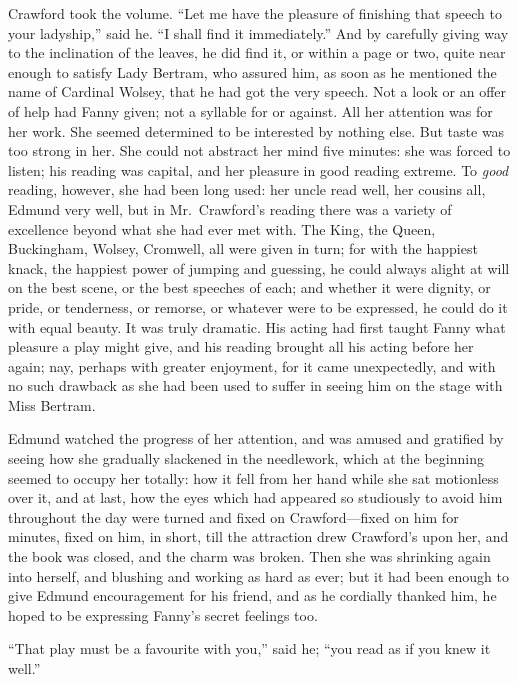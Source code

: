 Crawford took the volume.  ``Let me have the pleasure
of finishing that speech to your ladyship,'' said he.
``I shall find it immediately.''  And by carefully giving
way to the inclination of the leaves, he did find it,
or within a page or two, quite near enough to satisfy
Lady Bertram, who assured him, as soon as he mentioned the
name of Cardinal Wolsey, that he had got the very speech.
Not a look or an offer of help had Fanny given; not a syllable
for or against.  All her attention was for her work.
She seemed determined to be interested by nothing else.
But taste was too strong in her.  She could not abstract
her mind five minutes:  she was forced to listen; his reading
was capital, and her pleasure in good reading extreme.
To \emph{good} reading, however, she had been long used:
her uncle read well, her cousins all, Edmund very well,
but in Mr.\ Crawford's reading there was a variety of
excellence beyond what she had ever met with.  The King,
the Queen, Buckingham, Wolsey, Cromwell, all were given
in turn; for with the happiest knack, the happiest
power of jumping and guessing, he could always alight
at will on the best scene, or the best speeches of each;
and whether it were dignity, or pride, or tenderness,
or remorse, or whatever were to be expressed, he could
do it with equal beauty.  It was truly dramatic.
His acting had first taught Fanny what pleasure a play
might give, and his reading brought all his acting before
her again; nay, perhaps with greater enjoyment, for it
came unexpectedly, and with no such drawback as she had
been used to suffer in seeing him on the stage with Miss
Bertram.

Edmund watched the progress of her attention, and was
amused and gratified by seeing how she gradually slackened
in the needlework, which at the beginning seemed to
occupy her totally:  how it fell from her hand while
she sat motionless over it, and at last, how the eyes
which had appeared so studiously to avoid him throughout
the day were turned and fixed on Crawford---fixed on him
for minutes, fixed on him, in short, till the attraction
drew Crawford's upon her, and the book was closed,
and the charm was broken.  Then she was shrinking again
into herself, and blushing and working as hard as ever;
but it had been enough to give Edmund encouragement
for his friend, and as he cordially thanked him,
he hoped to be expressing Fanny's secret feelings too.

``That play must be a favourite with you,'' said he;
``you read as if you knew it well.''

